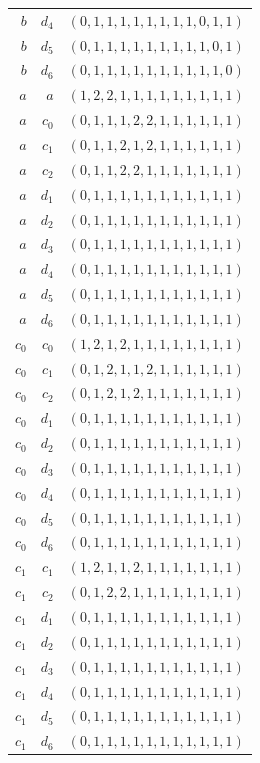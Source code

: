 \begin{longtable}{rrl}
$b$ & $d_{4}$ & $(0,1,1,1,1,1,1,1,1,0,1,1)$\\
$b$ & $d_{5}$ & $(0,1,1,1,1,1,1,1,1,1,0,1)$\\
$b$ & $d_{6}$ & $(0,1,1,1,1,1,1,1,1,1,1,0)$\\
$a$ & $a$ & $(1,2,2,1,1,1,1,1,1,1,1,1)$\\
$a$ & $c_{0}$ & $(0,1,1,1,2,2,1,1,1,1,1,1)$\\
$a$ & $c_{1}$ & $(0,1,1,2,1,2,1,1,1,1,1,1)$\\
$a$ & $c_{2}$ & $(0,1,1,2,2,1,1,1,1,1,1,1)$\\
$a$ & $d_{1}$ & $(0,1,1,1,1,1,1,1,1,1,1,1)$\\
$a$ & $d_{2}$ & $(0,1,1,1,1,1,1,1,1,1,1,1)$\\
$a$ & $d_{3}$ & $(0,1,1,1,1,1,1,1,1,1,1,1)$\\
$a$ & $d_{4}$ & $(0,1,1,1,1,1,1,1,1,1,1,1)$\\
$a$ & $d_{5}$ & $(0,1,1,1,1,1,1,1,1,1,1,1)$\\
$a$ & $d_{6}$ & $(0,1,1,1,1,1,1,1,1,1,1,1)$\\
$c_{0}$ & $c_{0}$ & $(1,2,1,2,1,1,1,1,1,1,1,1)$\\
$c_{0}$ & $c_{1}$ & $(0,1,2,1,1,2,1,1,1,1,1,1)$\\
$c_{0}$ & $c_{2}$ & $(0,1,2,1,2,1,1,1,1,1,1,1)$\\
$c_{0}$ & $d_{1}$ & $(0,1,1,1,1,1,1,1,1,1,1,1)$\\
$c_{0}$ & $d_{2}$ & $(0,1,1,1,1,1,1,1,1,1,1,1)$\\
$c_{0}$ & $d_{3}$ & $(0,1,1,1,1,1,1,1,1,1,1,1)$\\
$c_{0}$ & $d_{4}$ & $(0,1,1,1,1,1,1,1,1,1,1,1)$\\
$c_{0}$ & $d_{5}$ & $(0,1,1,1,1,1,1,1,1,1,1,1)$\\
$c_{0}$ & $d_{6}$ & $(0,1,1,1,1,1,1,1,1,1,1,1)$\\
$c_{1}$ & $c_{1}$ & $(1,2,1,1,2,1,1,1,1,1,1,1)$\\
$c_{1}$ & $c_{2}$ & $(0,1,2,2,1,1,1,1,1,1,1,1)$\\
$c_{1}$ & $d_{1}$ & $(0,1,1,1,1,1,1,1,1,1,1,1)$\\
$c_{1}$ & $d_{2}$ & $(0,1,1,1,1,1,1,1,1,1,1,1)$\\
$c_{1}$ & $d_{3}$ & $(0,1,1,1,1,1,1,1,1,1,1,1)$\\
$c_{1}$ & $d_{4}$ & $(0,1,1,1,1,1,1,1,1,1,1,1)$\\
$c_{1}$ & $d_{5}$ & $(0,1,1,1,1,1,1,1,1,1,1,1)$\\
$c_{1}$ & $d_{6}$ & $(0,1,1,1,1,1,1,1,1,1,1,1)$\\

\end{longtable}
